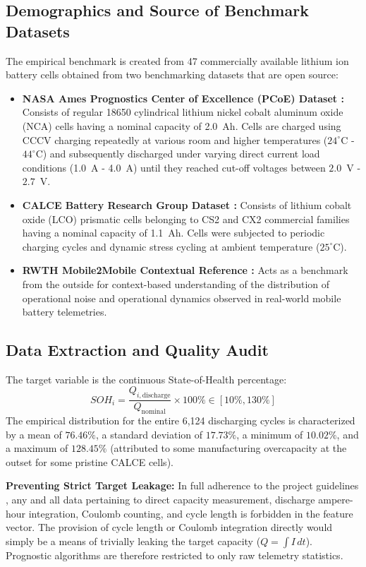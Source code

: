 \documentclass[a4paper,fleqn]{cas-sc}
\begin{document}
\subsection{Demographics and Source of Benchmark Datasets}
The empirical benchmark is created from 47 commercially available lithium ion battery cells obtained from two benchmarking datasets that are open source:
\begin{itemize}
    \item \textbf{NASA Ames Prognostics Center of Excellence (PCoE) Dataset \cite{saha2007nasa}:} Consists of regular 18650 cylindrical lithium nickel cobalt aluminum oxide (NCA) cells having a nominal capacity of 2.0~Ah. Cells are charged using CCCV charging repeatedly at various room and higher temperatures ($24^\circ$C - $44^\circ$C) and subsequently discharged under varying direct current load conditions (1.0~A - 4.0~A) until they reached cut-off voltages between $2.0$~V - $2.7$~V.
    \item \textbf{CALCE Battery Research Group Dataset \cite{calce2011battery}:} Consists of lithium cobalt oxide (LCO) prismatic cells belonging to CS2 and CX2 commercial families having a nominal capacity of 1.1~Ah. Cells were subjected to periodic charging cycles and dynamic stress cycling at ambient temperature ($25^\circ$C).
    \item \textbf{RWTH Mobile2Mobile Contextual Reference \cite{rwth2026mobile}:} Acts as a benchmark from the outside for context-based understanding of the distribution of operational noise and operational dynamics observed in real-world mobile battery telemetries.
\end{itemize}

\subsection{Data Extraction and Quality Audit}
The target variable is the continuous State-of-Health percentage:
\begin{equation}
    SOH_i = \frac{Q_{i, \text{discharge}}}{Q_{\text{nominal}}} \times 100\% \in [10\%, 130\%]
\end{equation}
The empirical distribution for the entire 6,124 discharging cycles is characterized by a mean of $76.46\%$, a standard deviation of $17.73\%$, a minimum of $10.02\%$, and a maximum of $128.45\%$ (attributed to some manufacturing overcapacity at the outset for some pristine CALCE cells).

\textbf{Preventing Strict Target Leakage:} In full adherence to the project guidelines \cite{guidelines}, any and all data pertaining to direct capacity measurement, discharge ampere-hour integration, Coulomb counting, and cycle length is forbidden in the feature vector. The provision of cycle length or Coulomb integration directly would simply be a means of trivially leaking the target capacity ($Q=\int I \, dt$). Prognostic algorithms are therefore restricted to only raw telemetry statistics.
\end{document}
